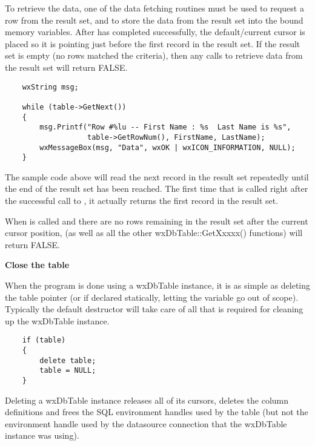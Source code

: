 To retrieve the data, one of the data fetching routines must be used to 
request a row from the result set, and to store the data from the result 
set into the bound memory variables.  After  
has completed successfully, the default/current cursor is placed so it 
is pointing just before the first record in the result set.  If the 
result set is empty (no rows matched the criteria), then any calls to 
retrieve data from the result set will return FALSE.

\begin{verbatim}
    wxString msg;

    while (table->GetNext())
    {
        msg.Printf("Row #%lu -- First Name : %s  Last Name is %s",
      	           table->GetRowNum(), FirstName, LastName);
        wxMessageBox(msg, "Data", wxOK | wxICON_INFORMATION, NULL);
    }
\end{verbatim}

The sample code above will read the next record in the result set repeatedly 
until the end of the result set has been reached.  The first time that 
 is called right after the successful 
call to , it actually returns the first record 
in the result set. 

When  is called and there are 
no rows remaining in the result set after the current cursor position, 
 (as well as all the other 
wxDbTable::GetXxxxx() functions) will return FALSE.


{\bf Close the table}

When the program is done using a wxDbTable instance, it is as simple as 
deleting the table pointer (or if declared statically, letting the 
variable go out of scope).  Typically the default destructor will take 
care of all that is required for cleaning up the wxDbTable instance.

\begin{verbatim}
    if (table)
    {
        delete table;
        table = NULL;
    }
\end{verbatim}

Deleting a wxDbTable instance releases all of its cursors, deletes the 
column definitions and frees the SQL environment handles used by the 
table (but not the environment handle used by the datasource connection 
that the wxDbTable instance was using).




